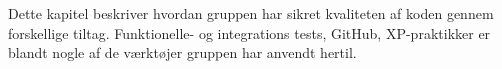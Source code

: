 Dette kapitel beskriver hvordan gruppen har sikret kvaliteten af koden gennem forskellige tiltag. 
Funktionelle- og integrations tests, GitHub, XP-praktikker er blandt nogle af de værktøjer gruppen har anvendt hertil.